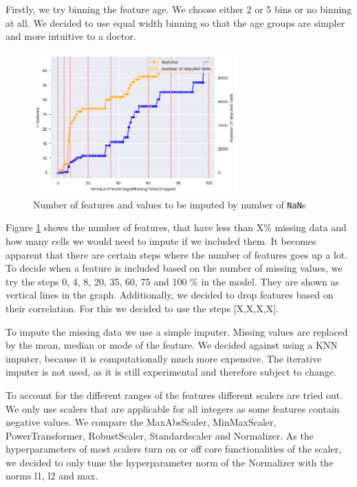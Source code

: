 Firstly, we try binning the feature age. We choose either 2 or 5 bins or no binning at all. We decided to use equal width binning so that the age groups are simpler and more intuitive to a doctor.

\begin{figure}[h]
	\centering
	\includegraphics[width=0.7\textwidth]{images/percentageToBeDropped.png}
	\caption{Number of features and values to be imputed by number of \texttt{NaN}s}
	\label{fig:percentageToBeDropped}
\end{figure}
Figure \ref{fig:percentageToBeDropped} shows the number of features, that have less than X\% missing data and how many cells we would need to impute if we included them. It becomes apparent that there are certain steps where the number of features goes up a lot. To decide when a feature is included based on the number of missing values, we try the steps 0, 4, 8, 20, 35, 60, 75 and 100 \% in the model. They are shown as vertical lines in the graph. Additionally, we decided to drop features based on their correlation. For this we decided to use the steps [X,X,X,X].

To impute the missing data we use a simple imputer. Missing values are replaced by the mean, median or mode of the feature. We decided against using a KNN imputer, because it is computationally much more expensive. The iterative imputer is not used, as it is still experimental and therefore subject to change.

To account for the different ranges of the features different scalers are tried out. We only use scalers that are applicable for all integers as some features contain negative values. 
We compare the MaxAbsScaler, MinMaxScaler, PowerTransformer, RobustScaler, Standardscaler and Normalizer. As the hyperparameters of most scalers turn on or off core functionalities of the scaler, we decided to only tune the hyperparameter norm of the Normalizer with the norms l1, l2 and max.

